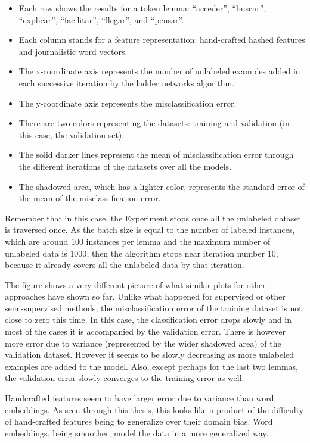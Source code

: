\begin{itemize}
  \item Each row shows the results for a token lemma: ``acceder'', ``buscar'',
    ``explicar'', ``facilitar'', ``llegar'', and ``pensar''.
  \item Each column stands for a feature representation: hand-crafted hashed
    features and journalistic word vectors.
  \item The x-coordinate axis represents the number of unlabeled examples added
    in each successive iteration by the ladder networks algorithm.
  \item The y-coordinate axis represents the misclassification error.
  \item There are two colors representing the datasets: training and validation
    (in this case, the validation set).
  \item The solid darker lines represent the mean of misclassification error
    through the different iterations of the datasets over all the models.
  \item The shadowed area, which has a lighter color, represents the standard
    error of the mean of the misclassification error.
\end{itemize}

Remember that in this case, the Experiment stops once all the unlabeled dataset
is traversed once. As the batch size is equal to the number of labeled
instances, which are around $100$ instances per lemma and the maximum number of
unlabeled data is $1000$, then the algorithm stops near iteration number 10,
because it already covers all the unlabeled data by that iteration.

The figure shows a very different picture of what similar plots for other
approaches have shown so far. Unlike what happened for supervised or other
semi-supervised methods, the misclassification error of the training dataset is
not close to zero this time. In this case, the classification error drops
slowly and in most of the cases it is accompanied by the validation error.
There is however more error due to variance (represented by the wider shadowed
area) of the validation dataset. However it seems to be slowly decreasing as
more unlabeled examples are added to the model. Also, except perhaps for the
last two lemmas, the validation error slowly converges to the training error as
well.

Handcrafted features seem to have larger error due to variance than word
embeddings. As seen through this thesis, this looks like a product of the
difficulty of hand-crafted features being to generalize over their domain bias.
Word embeddings, being smoother, model the data in a more generalized way.


